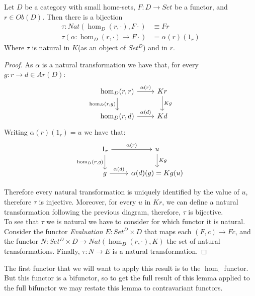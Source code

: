 \begin{theorem}\cite[Section 3.2]{mac2013categories}
  Let $D$ be a category with small home-sets, $F:D\to Set$ be a functor, and $r\in Ob(D)$. Then there is a bijection
  \begin{align*}
    \tau:Nat(\hom_D(r,\cdot), F\cdot) &\equiv Fr\\
    \tau(\alpha:\hom_D(r,\cdot)\to F\cdot)& = \alpha(r)(1_r)
  \end{align*}
  Where $\tau$ is natural in $K$(as an object of $Set^{D}$) and in $r$.
\end{theorem}
\begin{proof}
  As $\alpha$ is a natural transformation we have that, for every $g:r\to d\in Ar(D)$: 
    \[
      \begin{tikzcd}
        \hom_D(r,r)\arrow[swap]{d}{\hom_D(r,g)}\arrow{r}{\alpha(r)} & Kr\arrow{d}{Kg}\\
        \hom_D(r,d)\arrow{r}{\alpha(d)} & Kd
      \end{tikzcd}
    \]
Writing $\alpha(r)(1_r) = u$ we have that:
    \[
      \begin{tikzcd}
        1_r\arrow[swap]{d}{\hom_D(r,g)}\arrow{r}{\alpha(r)} & u\arrow{d}{Kg}\\
        g\arrow{r}{\alpha(d)} & \alpha(d)(g)=Kg(u)
      \end{tikzcd}
    \]

    Therefore every natural transformation is uniquely identified by the value of $u$, therefore $\tau$ is injective. Moreover, for every $u$ in $Kr$, we can define a natural transformation following the previous diagram, therefore, $\tau$ is bijective.\\

To see that $\tau$ we is natural we have to consider for which functor it is natural. Consider the functor \emph{Evaluation} $E: Set^D\times D$ that maps each $(F,c)\to Fc$, and the functor $N:Set^D\times D\to Nat(\hom_D(r,\cdot),K)$ the set of natural transformations. Finally, $\tau:N\to E$ is a natural transformation.
\end{proof}

The first functor that we will want to apply this result is to the $\hom_{\cdot}$ functor. But this functor is a bifunctor, so to get the full result of this lemma applied to the full bifunctor we may restate this lemma to contravariant functors.

